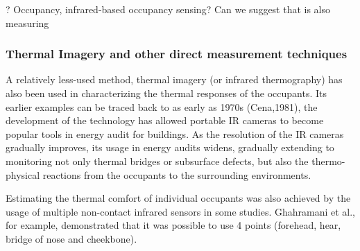 

? Occupancy, infrared-based occupancy sensing? Can we suggest that is also measuring 
\subsubsection{Thermal Imagery and other direct measurement techniques}
	A relatively less-used method, thermal imagery (or infrared thermography) has also been used in characterizing the thermal responses of the occupants. Its earlier examples can be traced back to as early as 1970s (Cena,1981), the development of the technology has allowed portable IR cameras to become popular tools in energy audit for buildings\cite{lucchi_applications_2018}. As the resolution of the IR cameras gradually improves, its usage in energy audits widens, gradually extending to monitoring not only thermal bridges or subsurface defects, but also the thermo-physical reactions from the occupants to the surrounding environments. %

	Estimating the thermal comfort of individual occupants was also achieved by the usage of multiple non-contact infrared sensors in some studies. Ghahramani et al., for example, demonstrated that it was possible to use 4 points (forehead, hear, bridge of nose and cheekbone)\cite{ghahramani_infrared_2016}. 
            
            
  